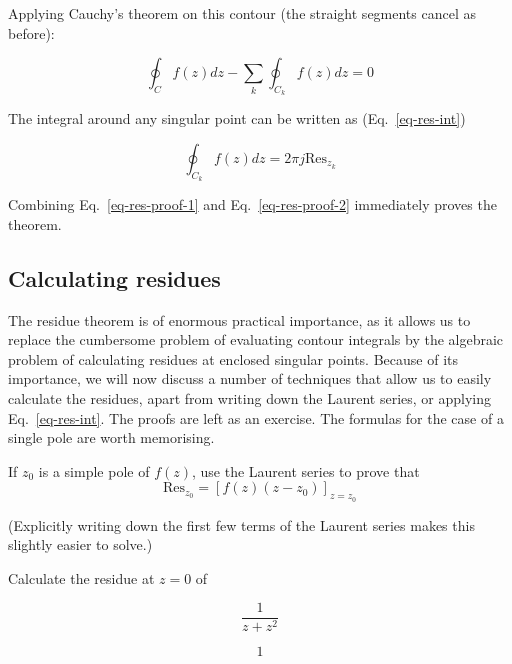Applying Cauchy's theorem on this contour (the straight segments cancel as before):

\begin{equation}
\oint_{{C}} f(z) dz - \sum_k \oint_{{C}_k} f(z) dz = 0
\label{eq-res-proof-1}
\end{equation}

The integral around any singular point can be written as (Eq.~\ref{eq-res-int})

\begin{equation}
\oint_{{C}_k} f(z) dz = 2 \pi j \mathrm{Res}_{z_k} \label{eq-res-proof-2}
\end{equation} 

Combining Eq.~\ref{eq-res-proof-1} and Eq.~\ref{eq-res-proof-2} immediately proves the theorem.

\pagebreak

\subsection*{Calculating residues}

The residue theorem is of enormous practical importance, as it allows us to replace the cumbersome problem of evaluating contour integrals by the algebraic problem of calculating residues at enclosed singular points. Because of its importance, we will now discuss a number of techniques that allow us to easily calculate the residues, apart from writing down the Laurent series, or applying Eq.~\ref{eq-res-int}. The proofs are left as an exercise. The formulas for the case of a single pole are worth memorising.

\begin{exer}
  If $z_0$ is a simple pole of $f(z)$, use the Laurent series to prove that
  $$\mathrm{Res}_{z_0} = \left[f(z)(z-z_0)\right]_{z=z_0}$$

  (Explicitly writing down the first few terms of the Laurent series makes this slightly easier to solve.)
  
\label{ex-res1}
\end{exer}

\begin{exer}
  Calculate the residue at $z=0$ of

   $$\frac{1}{z+z^2}$$ 
\begin{sol}
  $$1$$
\end{sol}
\end{exer}

